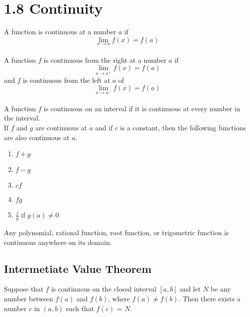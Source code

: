 %
%

\section*{1.8 Continuity}

A function is continuous at a number \(a\) if 
$$\lim_{x \to a}f(x) = f(a)$$\\
A function \(f\) is continuous from the right at a number \(a\) if 
$$\lim_{x \to a^+}f(x)=f(a)$$
and \(f\) is continuous from the left at \(a\) of 
$$\lim_{x \to a^-}f(x)=f(a)$$\\
A function \(f\) is continuous on an interval if it is continuous at every number in the interval.\\

If \(f\) and \(g\) are continuous at \(a\) and if \(c\) is a constant, then the following functions are also continuous at \(a\).
\begin{enumerate}
    \item \(f + g\)
    \item \(f - g\)
    \item \(cf\)
    \item \(fg\)
    \item \(\frac{f}{g}\) if \(g(a) \neq 0\)
\end{enumerate}
Any polynomial, rational function, root function, or trigometric function is continuous anywhere on its domain.

\subsection*{Intermetiate Value Theorem}

Suppose that \(f\) is continuous on the closed interval \([a, b]\) and let \(N\) be any number between \(f(a)\) and \(f(b)\), where \(f(a) \neq f(b)\). Then there exists a number \(c\) in \((a, b)\) such that \(f(c)\) = \(N\).
